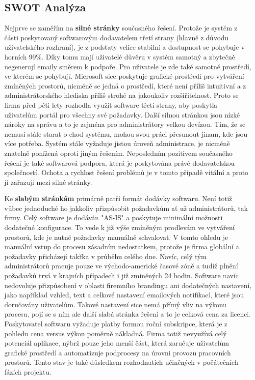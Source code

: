 \documentclass[12pt]{article}
\begin{document}
\begin{sloppypar}
\begin{spacing}{1.15}
        \subsection*{SWOT Analýza}
        Nejprve se zaměřím na \textbf{silné stránky} současného řešení. Protože
        je systém z části poskytovaný softwarovým dodavatelem třetí strany
        (hlavně z důvodu uživatelského rozhraní), je z podstaty velice stabilní a
        dostupnost se pohybuje v horních 99\%. Díky tomu mají uživatelé důvěru v
        systém samotný a zbytečně negenerují emaily směrem k podpoře. Pro
        uživatele je zde také samotné prostředí, ve kterém se pohybují.
        Microsoft sice poskytuje grafické prostředí pro vytváření zmíněných
        prostorů, nicméně se jedná o prostředí, které není příliš intuitivní a 
        z administrátorského hlediska příliš strohé na jakoukoliv
        rozšiřitelnost. Proto se firma před pěti lety rozhodla využít software
        třetí strany, aby poskytla uživatelům portál pro všechny své požadavky.
        Další silnou stránkou jsou nízké nároky na správu a to je zejména pro 
        administrátory velkou devízou. Tím, že se nemusí stále starat o chod
        systému, mohou svou práci přesunout jinam, kde jsou více potřeba. Systém
        stále vyžaduje jistou úroveň administrace, je nicméně znatelně ponížená
        oproti jiným řešením. Neposledním pozitivem současného řešení je také
        softwarová podpora, která je poskytována právě dodavatelskou
        společností. Ochota a rychlost řešení problémů je v tomto případě
        vitální a proto ji zařazuji mezi silné stránky.

        Ke \textbf{slabým stránkám} primárně patří formát dodávky softwaru. Není
        totiž vůbec jednoduché
        ho jakkoliv přizpůsobit požadavkům ať už administrátorů, tak firmy. Celý
        software je dodáván "AS-IS" a poskytuje minimální možnosti dodatečné
        konfigurace. To vede k již výše zmíněným prodlevám ve vytváření
        prostorů, kde je nutné požadavky manuálně schvalovat. V tomto ohledu je
        manuální vstup do procesu zásadním nedostatkem, protože je firma
        globální a požadavky přicházejí takřka v průběhu celého dne. Navíc, celý 
        tým administrátorů pracuje pouze ve východo-americké časové zóně a tudíž
        plnění požadavků trvá v krajních případech i již zmíněných 24 hodin.
        Software navíc nedovoluje přizpůsobení v oblasti firemního brandingu ani
        dodatečných nastavení, jako například vzhled, text a celkové nastavení
        emailových notifikací, které jsou doručovány uživatelům. Takové
        nastavení sice nemá přímý vliv na výkonu procesu, pojí se s ním ale další
        slabá stránka řešení a to je celková cena za licenci. Poskytovatel
        softwaru vyžaduje platby formou roční subskripce, která je z pohledu
        cena versus výkon poměrně nákladná. Firma totiž nevyužívá celý potenciál
        aplikace, nýbrž pouze jeho menší část, která zaručuje uživatelům
        grafické prostředí a automatizuje podprocesy na úrovni provozu
        pracovních prostorů. Tento stav je také důsledkem rozhodnutích učiněných
        v počátečních fázích projektu.


\end{spacing}
\end{sloppypar}
\end{document}

